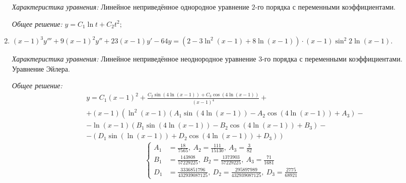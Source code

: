 \begin{enumerate}
                \textit{Характеристика уравнения:}
                    Линейное неприведённое однородное уравнение \(2\)-го порядка с переменными коэффициентами.
                
                \textit{Общее решение:}
                    \( y = C_1 \ln{t} + C_2 t^2; \)
                

            \item \( (x-1)^3 y''' + 9 (x-1)^2 y'' + 23(x-1)y' - 64y = \left( 2 - 3\ln^2(x-1)  + 8\ln(x-1) \right) \cdot (x-1) \sin^2 2\ln(x-1). \)
            
                \textit{Характеристика уравнения:}
                    Линейное неприведённое неоднородное уравнение 3-го порядка с переменными коэффициентами. Уравнение Эйлера.
                
                \textit{Общее решение:}
                    \[ 
                        \begin{aligned}
                            &y=C_1 (x-1)^2+ \frac{C_{2} \sin \left(4 \ln(x-1) \right)+C_{3} \cos\left(4 \ln(x-1)\right)}{({x-1})^{4}} +\\
                            &+(x-1) \left(\ln^{2}(x-1) \left( A_1 \sin\left(4 \ln(x-1)\right) - A_2 \cos\left(4 \ln(x-1)\right) + A_3 \right)\right.- \\
                            &- \ln(x-1) \left( B_1 \sin\left(4 \ln(x-1)\right) - B_2 \cos\left(4 \ln(x-1)\right) + B_3 \right) - \\
                            &- \left. \left( D_1 \sin\left( \ln(x-1)\right) + D_2 \cos\left(4 \ln(x-1)\right) + D_3 \right) \right)
                        \end{aligned}
                    \]
                    \[
                        \left\lbrace
                        \begin{aligned}
                            A_1 &= \frac{18}{7565}, ~ A_2 = \frac{111}{15130}, ~ A_3 = \frac{3}{82} \\
                            B_1 &= \frac{143808}{57229225}, ~ B_2 = \frac{1373903}{57229225}, ~ A_3 = \frac{71}{1681} \\
                            D_1 &= \frac{3336851796}{432939087125}, ~ D_2 = \frac{295897989}{432939087125}, ~ D_3 = \frac{2775}{68921} 
                        \end{aligned}
                        \right.
                    \]




\end{enumerate}
